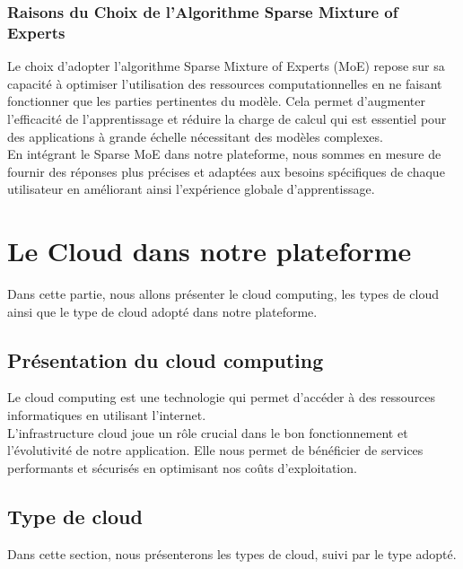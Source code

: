 \subsubsection{Raisons du Choix de l'Algorithme Sparse Mixture of Experts }
\justifying
Le choix d'adopter l'algorithme Sparse Mixture of Experts (MoE) repose sur sa capacité à optimiser l'utilisation des ressources computationnelles en ne faisant fonctionner que les parties pertinentes du modèle. Cela permet d'augmenter l'efficacité de l'apprentissage et réduire la charge de calcul qui est essentiel pour des applications à grande échelle nécessitant des modèles complexes.\\
En intégrant le Sparse MoE dans notre plateforme, nous sommes en mesure de fournir des réponses plus précises et adaptées aux besoins spécifiques de chaque utilisateur en améliorant ainsi l'expérience globale d'apprentissage.


\section{Le Cloud dans notre plateforme}
\justifying
Dans cette partie, nous allons présenter le cloud computing, les types de cloud ainsi que le type de cloud adopté dans notre plateforme.

\subsection{Présentation du cloud computing}
\justifying
Le cloud computing est une technologie qui permet d'accéder à des ressources informatiques en utilisant l’internet.\\
L'infrastructure cloud joue un rôle crucial dans le bon fonctionnement et l'évolutivité de notre application. Elle nous permet de bénéficier de services performants et sécurisés en optimisant nos coûts d'exploitation.

\subsection{Type de cloud}
\justifying
Dans cette section, nous présenterons les types de cloud, suivi par le type adopté.

